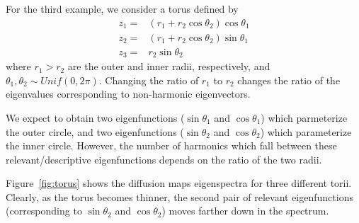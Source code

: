 \documentclass[preprint]{elsarticle}
\begin{document}
For the third example, we consider a torus defined by
%
\begin{equation}
\begin{aligned}
z_1 =& (r_1 + r_2 \cos \theta_2 ) \cos \theta_1 \\
z_2 =& (r_1 + r_2 \cos \theta_2 ) \sin \theta_1 \\
z_3 =& r_2 \sin \theta_2
\end{aligned}
\end{equation}
%
where $r_1 > r_2$ are the outer and inner radii, respectively, and $\theta_1, \theta_2 \sim Unif(0, 2 \pi)$. 
%
Changing the ratio of $r_1$ to $r_2$ changes the ratio of the eigenvalues corresponding to non-harmonic eigenvectors. 

We expect to obtain two eigenfunctions ($\sin \theta_1$ and $\cos \theta_1$) which parmeterize the outer circle, and two eigenfunctions ($\sin \theta_2$ and $\cos \theta_2$) which parameterize the inner circle. 
%
However, the number of harmonics which fall between these relevant/descriptive eigenfunctions depends on the ratio of the two radii. 

Figure~\ref{fig:torus} shows the diffusion maps eigenspectra for three different torii. 
%
Clearly, as the torus becomes thinner, the second pair of relevant eigenfunctions (corresponding to $\sin \theta_2$ and $\cos \theta_2$) moves farther down in the spectrum. 
\end{document}
